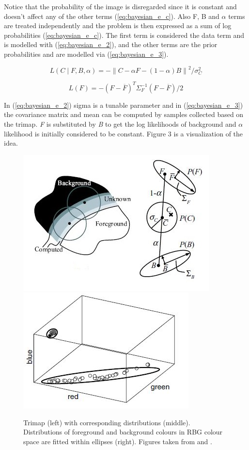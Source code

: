 Notice that the probability of the image is disregarded since it is constant and doesn’t affect any of the other terms (\ref{eq:bayesian_e_c}). Also F, B and $\alpha$ terms are treated independently and the problem is then expressed as a sum of log probabilities (\ref{eq:bayesian_e_c}). The first term is considered the data term and is modelled with (\ref{eq:bayesian_e_2}), and the other terms are the prior probabilities and are modelled via (\ref{eq:bayesian_e_3}).

\begin{equation} \label{eq:bayesian_e_2}
L(C\mid F,B,\alpha)=-\left \| C-\alpha F-(1-\alpha)B \right \|^{2}/\sigma_{C}^{2}
\end{equation}

\begin{equation} \label{eq:bayesian_e_3}
L(F)=-(F-\overline{F})^{T}\Sigma _{F}^{-1}(F-\overline{F})/2
\end{equation}

In (\ref{eq:bayesian_e_2}) sigma is a tunable parameter and in (\ref{eq:bayesian_e_3}) the covariance matrix and mean can be computed by samples collected based on the trimap. \textit{F} is substituted by \textit{B} to get the log likelihoods of background and $\alpha$ likelihood is initially considered to be constant. Figure 3 is a visualization of the idea.

\begin{figure}[t!]
\includegraphics[width=0.5\columnwidth]{Chapter2/2/bayesian_figure_1.jpg}
\includegraphics[width=0.5\columnwidth]{Chapter2/2/bayesian_figure_2.jpg}
\caption[Foreground and background distributions.]{Trimap (left) with corresponding distributions (middle). Distributions of foreground and background colours in RBG colour space are fitted within ellipses (right). Figures taken from \cite{bayesian} and \cite{visualeffects}.}
\label{fig:bayesian_e_f_4}
\end{figure}

